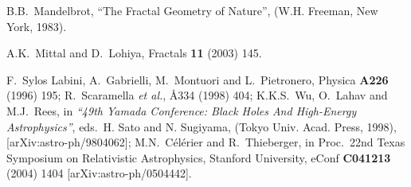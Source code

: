 \documentclass[12pt]{article}
\begin{document}
\begin{thebibliography}{66}
B.B.~Mandelbrot,
{``The Fractal Geometry of Nature''},
(W.H. Freeman, New York, 1983).

A.K.~Mittal and D.~Lohiya,
Fractals {\bf 11} (2003) 145. %

F.~Sylos Labini, A.~Gabrielli, M.~Montuori and L.~Pietronero,
Physica {\bf A226} (1996) 195; %
R.~Scaramella {\it et al.},
\AA{334} (1998) 404; %
K.K.S.~Wu, O.~Lahav and M.J.~Rees,
in {\em``49th Yamada Conference: Black Holes And High-Energy Astrophysics''},
eds.\ H. Sato and N. Sugiyama, (Tokyo Univ. Acad. Press, 1998),
[arXiv:astro-ph/9804062];
M.N.~C\'el\'erier and R.~Thieberger,
in Proc.\ 22nd Texas Symposium on Relativistic Astrophysics, Stanford
University, eConf {\bf C041213} (2004) 1404 [arXiv:astro-ph/0504442].
\end{thebibliography}
\end{document}
